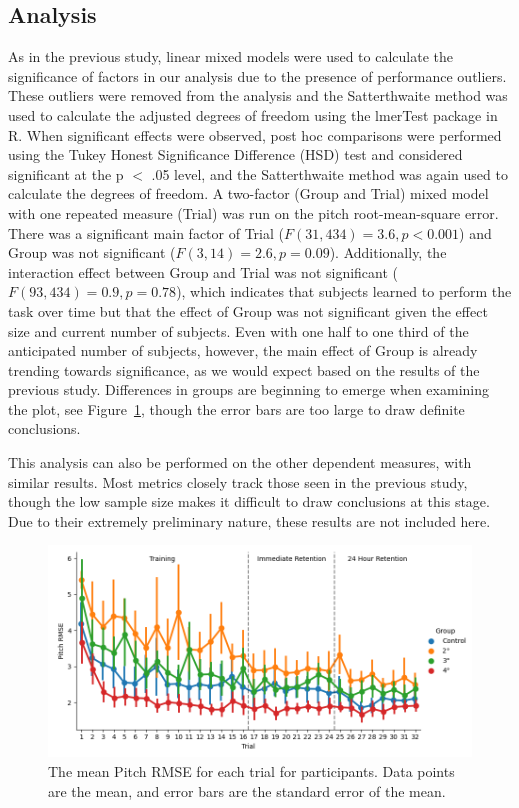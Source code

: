 \subsection{Analysis}

As in the previous study, linear mixed models were used to calculate the significance of factors in our analysis due to the presence of performance outliers.
These outliers were removed from the analysis and the Satterthwaite method was used to calculate the adjusted degrees of freedom using the lmerTest package in R.
When significant effects were observed, post hoc comparisons were performed using the Tukey Honest Significance Difference (HSD) test and considered significant at the p $<$ .05 level, and the Satterthwaite method was again used to calculate the degrees of freedom.
A two-factor (Group and Trial) mixed model with one repeated measure (Trial) was run on the pitch root-mean-square error.
There was a significant main factor of Trial ($F(31, 434) = 3.6, p < 0.001$) and Group was not significant ($F(3, 14) = 2.6, p = 0.09$).
Additionally, the interaction effect between Group and Trial was not significant ($F(93, 434) = 0.9, p = 0.78$), which indicates that subjects learned to perform the task over time but that the effect of Group was not significant given the effect size and current number of subjects.
Even with one half to one third of the anticipated number of subjects, however, the main effect of Group is already trending towards significance, as we would expect based on the results of the previous study.
Differences in groups are beginning to emerge when examining the plot, see Figure~\ref{figure-bw:pitchrmse}, though the error bars are too large to draw definite conclusions.

This analysis can also be performed on the other dependent measures, with similar results.
Most metrics closely track those seen in the previous study, though the low sample size makes it difficult to draw conclusions at this stage.
Due to their extremely preliminary nature, these results are not included here.

\begin{figure}[tb!]
    \begin{center}
        \includegraphics[width=\linewidth]{figures/Aircraft/Bandwidth-PitchRMSE.png}
        \caption[The mean Pitch RMSE for each trial]{The mean Pitch RMSE for each trial for participants. Data points are the mean, and error bars are the standard error of the mean.}
        \label{figure-bw:pitchrmse}
    \end{center}
\end{figure}

